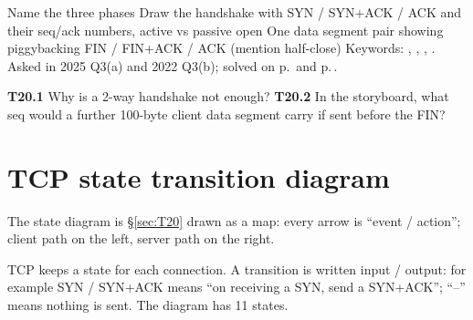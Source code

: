 \begin{answerplan}
 Name the three phases \quad {} Draw the handshake with SYN / SYN+ACK / ACK and their seq/ack numbers, active vs passive open \quad
{} One data segment pair showing piggybacking \quad {} FIN / FIN+ACK / ACK (mention half-close) \quad
Keywords: , , , . Asked in 2025 Q3(a) and 2022 Q3(b); solved on p.\,\pageref{q:MS2025-3a} and p.\,\pageref{q:MS2022-3b}.
\par{} \textbf{T20.1} Why is a 2-way handshake not enough?\quad
\textbf{T20.2} In the storyboard, what seq would a further 100-byte client data segment carry if sent before the FIN?
\end{answerplan}

\section{TCP state transition diagram}\label{sec:T21}
  

\begin{intuitionbox}
The state diagram is \S\ref{sec:T20} drawn as a map: every arrow is ``event / action''; client path on the left, server path on the right.
\end{intuitionbox}

\begin{definitionbox}
TCP keeps a state for each connection. A transition is written \textsf{input / output}: for example \textsf{SYN / SYN+ACK} means ``on receiving a SYN, send a SYN+ACK'';
``--'' means nothing is sent. The diagram has 11 states. 
\end{definitionbox}

